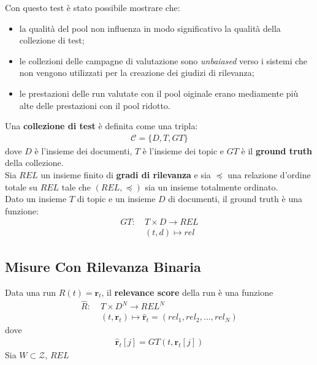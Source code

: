 \documentclass{article}
\begin{document}
Con questo test è stato possibile mostrare che:
\begin{itemize}
\item la qualità del pool non influenza in modo significativo la qualità della collezione di test;
\item le collezioni delle campagne di valutazione sono \textit{unbaiased} verso i sistemi che non vengono utilizzati per la creazione dei giudizi di rilevanza;
\item le prestazioni delle run valutate con il pool oiginale erano mediamente più alte delle prestazioni con il pool ridotto.
\end{itemize}
Una \textbf{collezione di test} è definita come una tripla:
\begin{align*}
\mathcal{C} = \{D, T, GT\}
\end{align*}
dove $D$ è l'insieme dei documenti, $T$ è l'insieme dei topic e $GT$ è il \textbf{ground truth} della collezione.\\
Sia $REL$ un insieme finito di \textbf{gradi di rilevanza} e sia $\preceq$ una relazione d'ordine totale su $REL$ tale che $(REL, \preceq)$ sia un insieme totalmente ordinato.\\
Dato un insieme $T$ di topic e un insieme $D$ di documenti, il ground truth è una funzione:
\begin{align*}
GT :\: &T \times D \to 	   REL\\
       &(t, d)     \mapsto rel
\end{align*}

\subsection{Misure Con Rilevanza Binaria}
Data una run $R(t) = \mathbf{r}_t$, il \textbf{relevance score} della run è una funzione
\begin{align*}
\hat{R}:&\;T \times D^N \to REL^N\\
	    &\;(t,\mathbf{r}_t) \mapsto \hat{\mathbf{r}}_t = (rel_1, rel_2, ..., rel_N)
\end{align*}
dove
\begin{align*}
\hat{\mathbf{r}}_t[j] = GT(t, \mathbf{r}_t[j])
\end{align*}
Sia $W\subset\mathcal{Z}$, $REL$ 


%
%
\end{document}
